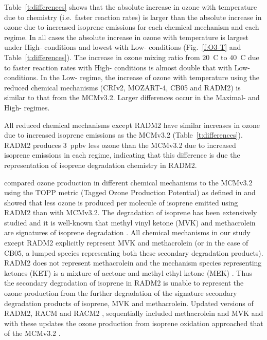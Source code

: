 Table~\ref{t:differences} shows that the absolute increase in ozone with temperature due to chemistry (i.e.~faster reaction rates) is larger than the absolute increase in ozone due to increased isoprene emissions for each chemical mechanism and each  regime.
In all cases the absolute increase in ozone with temperature is largest under High- conditions and lowest with Low- conditions (Fig.~\ref{f:O3-T} and Table~\ref{t:differences}).
The increase in ozone mixing ratio from $20$~\degree C to $40$~\degree C due to faster reaction rates with High- conditions is almost double that with Low- conditions.  
In the Low- regime, the increase of ozone with temperature using the reduced chemical mechanisms (CRIv2, MOZART-4, CB05 and RADM2) is similar to that from the MCMv3.2. 
Larger differences occur in the Maximal- and High- regimes.

All reduced chemical mechanisms except RADM2 have similar increases in ozone due to increased isoprene emissions as the MCMv3.2 (Table~\ref{t:differences}).
RADM2 produces $3$~ppbv less ozone than the MCMv3.2 due to increased isoprene emissions in each  regime, indicating that this difference is due the representation of isoprene degradation chemistry in RADM2.

\citet{Coates:2015} compared ozone production in different chemical mechanisms to the MCMv3.2 using the TOPP metric (Tagged Ozone Production Potential) as defined in \citet{Butler:2011} and showed that less ozone is produced per molecule of isoprene emitted using RADM2 than with MCMv3.2.
The degradation of isoprene has been extensively studied and it is well-known that methyl vinyl ketone (MVK) and methacrolein are signatures of isoprene degradation \citep{Atkinson:2000}.
All chemical mechanisms in our study except RADM2 explicitly represent MVK and methacrolein (or in the case of CB05, a lumped species representing both these secondary degradation products).
RADM2 does not represent methacrolein and the mechanism species representing ketones (KET) is a mixture of acetone and methyl ethyl ketone (MEK) \citep{Stockwell:1990}. 
Thus the secondary degradation of isoprene in RADM2 is unable to represent the ozone production from the further degradation of the signature secondary degradation products of isoprene, MVK and methacrolein.
Updated versions of RADM2, RACM \citep{Stockwell:1997} and RACM2 \citep{Goliff:2013}, sequentially included methacrolein and MVK and with these updates the ozone production from isoprene oxidation approached that of the MCMv3.2 \citep{Coates:2015}.


